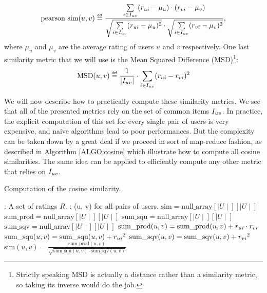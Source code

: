 $$
\text{pearson sim}(u, v) \eqdef \frac{ \sum\limits_{i \in \Iuv}
(\rui -  \mu_u) \cdot (\rvi - \mu_{v})} {\sqrt{\sum\limits_{i
\in \Iuv} (\rui -  \mu_u)^2} \cdot \sqrt{\sum\limits_{i \in
\Iuv} (\rvi -  \mu_{v})^2}},
$$
where $\mu_u$ and $\mu_v$ are the average rating of users $u$ and $v$
respectively.
One last similarity metric that we will use is the Mean Squared Difference
(MSD)\footnote{Strictly speaking MSD is actually a distance rather than a
similarity metric, so taking its inverse would do the job.}:
$$\text{MSD}(u, v) \eqdef \frac{1}{|\Iuv|} \cdot \sum\limits_{i \in \Iuv} (\rui -
\rvi)^2$$

We will now describe how to practically compute these similarity metrics. We
see that all 
of the presented metrics rely on the set of common items $I_{uv}$. In practice,
the explicit computation of this set for every single pair of users is very
expensive, and naive algorithms lead to poor performances. But the
complexity can be taken down by a great deal if we proceed in sort of
map-reduce fashion, as described in Algorithm \ref{ALGO:cosine} which
illustrate how to compute all cosine similarities. The same idea can be applied
to efficiently compute any other metric that relies on $I_{uv}$.

\begin{algorithm}[!ht]
 \caption{Computation of the cosine similarity.}
       \label{ALGO:cosine}
       \begin{algorithmic}

         : A set of ratings $R$.
         : (u, v) for all pairs of users.
         \STATE $\text{sim} = \text{null\_array}\left[\mid U \mid\right]\left[\mid U \mid\right]$
         \STATE $\text{sum\_prod} = \text{null\_array}\left[\mid U \mid\right]\left[\mid U \mid\right]$
         \STATE $\text{sum\_squ} = \text{null\_array}[\mid U \mid][\mid U \mid]$
         \STATE $\text{sum\_sqv} = \text{null\_array}[\mid U \mid][\mid U \mid]$
              \STATE $\text{sum\_prod}(u, v) = \text{sum\_prod}(u, v) + r_{ui} \cdot r_{vi}$
              \STATE $\text{sum\_squ}(u, v) = \text{sum\_squ}(u, v) + {r_{ui}}^2$
              \STATE $\text{sum\_sqv}(u, v) = \text{sum\_sqv}(u, v) + {r_{vi}}^2$
             \ENDFOR
           \ENDFOR
         \ENDFOR
           \STATE $\text{sim}(u, v) = \frac{\text{sum\_prod}(u,
           v)}{\sqrt{\text{sum\_squ}(u, v) \cdot \text{sum\_sqv}(u, v)}}$
           \ENDFOR
         \ENDFOR
\end{algorithmic}
\end{algorithm}


